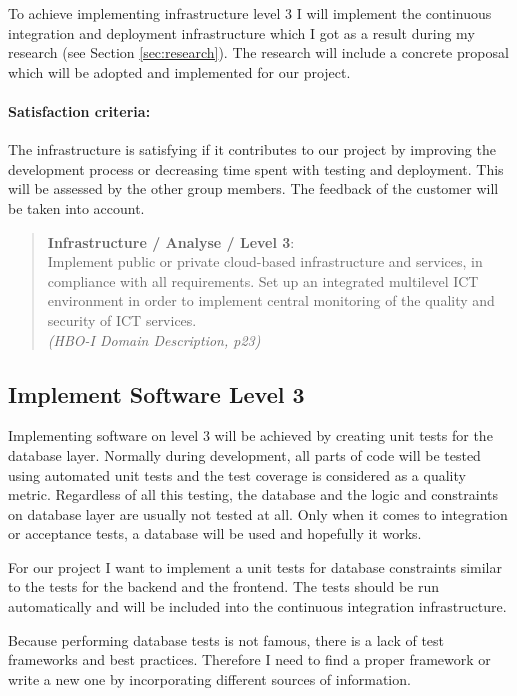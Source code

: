 To achieve implementing infrastructure level 3 I will implement the continuous integration and deployment infrastructure which I got as a result during my research (see Section \ref{sec:research}).
The research will include a concrete proposal which will be adopted and implemented for our project.

\paragraph{Satisfaction criteria:} The infrastructure is satisfying if it contributes to our project by improving the development process or decreasing time spent with testing and deployment. This will be assessed by the other group members. The feedback of the customer will be taken into account.

\begin{minipage}{\textwidth}
\begin{quote}
	\textbf{Infrastructure / Analyse / Level 3}: \\
	Implement public or private cloud-based infrastructure and services, in compliance with all requirements. 
	Set up an integrated multilevel ICT environment in order to implement central monitoring of the quality and security of ICT services.
	\\ \textit{(HBO-I Domain Description, p23)}
\end{quote}
\end{minipage}


\subsection{Implement Software Level 3}

Implementing software on level 3 will be achieved by creating unit tests for the database layer.
Normally during development, all parts of code will be tested using automated unit tests and the test coverage is considered as a quality metric. 
Regardless of all this testing, the database and the logic and constraints on database layer are usually not tested at all.
Only when it comes to integration or acceptance tests, a database will be used and hopefully it works.

For our project I want to implement a unit tests for database constraints similar to the tests for the backend and the frontend. The tests should be run automatically and will be included into the continuous integration infrastructure.

Because performing database tests is not famous, there is a lack of test frameworks and best practices. Therefore I need to find a proper framework or write a new one by incorporating different sources of information.

